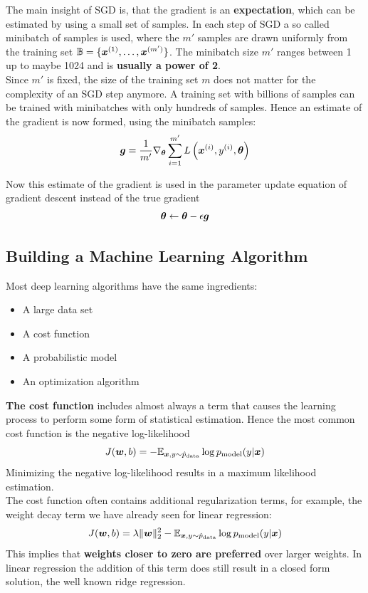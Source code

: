 \begin{multicols}{2}
	The main insight of SGD is, that the gradient is an \textbf{expectation}, which can be estimated by using a small set of samples.
	In each step of SGD a so called minibatch of samples is used, where the $m'$ samples are drawn uniformly from the training set ${\mathbb{B}}=\{{\bm{x}}^{(1)},\dots,{\bm{x}}^{(m')}  \}$. The minibatch size $m'$ ranges between 1 up to maybe 1024 and is \textbf{usually a power of 2}.\\
	Since $m'$ is fixed, the size of the training set $m$ does not matter for the complexity of an SGD step anymore.
	A training set with billions of samples can be trained with minibatches with only hundreds of samples.
	Hence an estimate of the gradient is now formed, using the minibatch samples:
	\[ \bol{g} = \frac{1}{m'} \nabla_\bolt \sum_{i=1}^{m'} L\left(\vx^{(i)},y^{(i)},\bolt\right) \]

	Now this estimate of the gradient is used in the parameter update equation of gradient descent instead of the true gradient
	\[ \bolt \leftarrow \bolt - \epsilon \bol{g} \]

	\subsection{Building a Machine Learning Algorithm}
	Most deep learning algorithms have the same ingredients:
	\begin{itemize}
		\item A large data set
		\item A cost function
		\item A probabilistic model
		\item An optimization algorithm
	\end{itemize}

	\textbf{The cost function} includes almost always a term that causes the learning process to perform some form of statistical estimation.
	Hence the most common cost function is the negative log-likelihood
	\[ J(\bol{w},b) = - \Exp_{\vx,y\sim \hat{p}_{\text{data}}} \log p_{\text{model}}(y|\vx) \]
	Minimizing the negative log-likelihood results in a maximum likelihood estimation.\\

	The cost function often contains additional regularization terms, for example, the weight decay term we have already seen for linear regression:
	\[ J(\bol{w},b) = \lambda\lVert \bol{w}\rVert_2^2 - \Exp_{\vx,y\sim \hat{p}_{\text{data}}} \log p_{\text{model}}(y|\vx) \]
	This implies that \textbf{weights closer to zero are preferred} over larger weights.
	In linear regression the addition of this term does still result in a closed form solution, the well known ridge regression.


\end{multicols}
